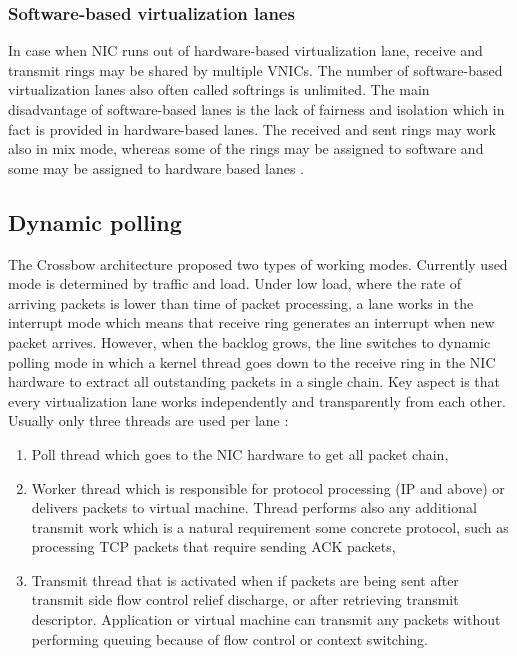\documentclass[11pt]{book}
\begin{document}
        
        \subsubsection{Software-based virtualization lanes}
        
          In case when NIC runs out of hardware-based virtualization lane, receive and transmit rings may be shared by
          multiple VNICs. The number of software-based virtualization lanes also often called softrings is unlimited.
          The main disadvantage of software-based lanes is the lack of fairness and isolation which in fact is provided
          in hardware-based lanes. The received and sent rings may work also in mix mode, whereas some of the rings may
          be assigned to software and some may be assigned to hardware based lanes \cite{crossbow}.	
			
      \subsection{Dynamic polling}	
        
        The Crossbow architecture proposed two types of working modes. Currently used mode is determined by traffic and
        load. Under low load, where the rate of arriving packets is lower than time of packet processing, a lane works in
        the interrupt mode which means that receive ring generates an interrupt when new packet arrives. However, when
        the backlog grows, the line switches to dynamic polling mode in which a kernel thread goes down to the receive
        ring in the NIC hardware to extract all outstanding packets in a single chain. Key aspect is that every
        virtualization lane works independently and transparently from each other. Usually only three threads are used
        per lane \cite{crossbow}:
        
        \begin{enumerate}
          \item Poll thread which goes to the NIC hardware to get all packet chain,
          \item Worker thread which is responsible for protocol processing (IP and above) or delivers packets to virtual
                machine. Thread performs also any additional transmit work which is a natural 
                requirement some concrete protocol, such as processing TCP packets that require sending ACK packets,
          \item Transmit thread that is activated when if packets are being sent after transmit side flow control relief
                discharge, or after retrieving transmit descriptor. Application or virtual 
                machine can transmit any packets without performing queuing because of flow control or context switching.
        \end{enumerate}
\end{document}
